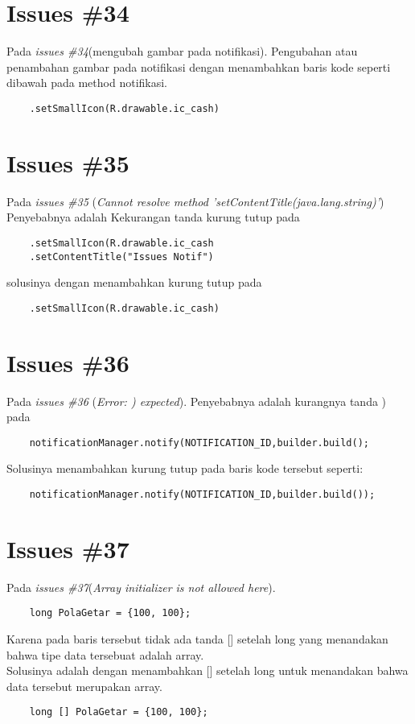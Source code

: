 \section{Issues \#34}
Pada \textit{issues \#34}(mengubah gambar pada notifikasi). Pengubahan atau penambahan gambar pada notifikasi dengan menambahkan baris kode seperti dibawah pada method notifikasi.
\begin{verbatim}
    .setSmallIcon(R.drawable.ic_cash)
\end{verbatim}

\section{Issues \#35}
Pada \textit{issues \#35} (\textit{Cannot resolve method 'setContentTitle(java.lang.string)'}) Penyebabnya adalah Kekurangan tanda kurung tutup pada
\begin{verbatim}
    .setSmallIcon(R.drawable.ic_cash
    .setContentTitle("Issues Notif")
\end{verbatim}
solusinya dengan menambahkan kurung tutup pada 
\begin{verbatim}
    .setSmallIcon(R.drawable.ic_cash)
\end{verbatim}

\section{Issues \#36}
Pada \textit{issues \#36} (\textit{Error: ) expected}). Penyebabnya adalah kurangnya tanda ) pada 
\begin{verbatim}
    notificationManager.notify(NOTIFICATION_ID,builder.build();
\end{verbatim}
Solusinya menambahkan kurung tutup pada baris kode tersebut seperti:
\begin{verbatim}
    notificationManager.notify(NOTIFICATION_ID,builder.build());
\end{verbatim}

\section{Issues \#37}
Pada \textit{issues \#37}(\textit{Array initializer is not allowed here}).
\begin{verbatim}
    long PolaGetar = {100, 100};
\end{verbatim}
Karena pada baris tersebut tidak ada tanda [] setelah long yang menandakan bahwa tipe data tersebuat adalah array.\\
Solusinya adalah dengan menambahkan [] setelah long untuk menandakan bahwa data tersebut merupakan array.
\begin{verbatim}
    long [] PolaGetar = {100, 100};
\end{verbatim}


